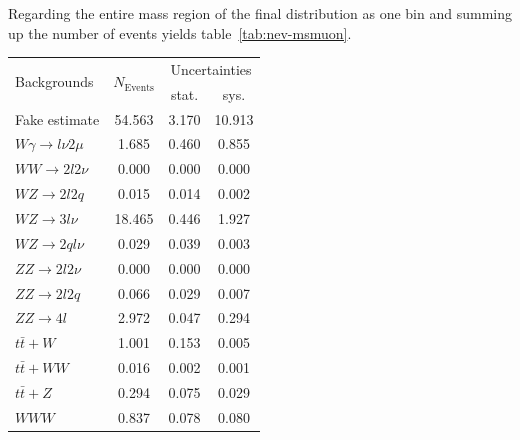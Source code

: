 Regarding the entire mass region of the final distribution as one bin and summing up the number of events yields table~\ref{tab:nev-msmuon}.

\begin{table}[!htb]
  \centering
  \begin{tabular}{|l|c|c|c|}
    \hline
    \multirow{2}{*}{Backgrounds}    & \multirow{2}{*}{$N_{\text{Events}}$} & \multicolumn{2}{|c|}{Uncertainties} \\ \cline{3-4}
                                    &                                      & stat. & sys.                        \\ \hline \hline
    Fake estimate                   & 54.563                               & 3.170 & 10.913                      \\ \hline
    $W\gamma \rightarrow l\nu 2\mu$ & 1.685                                & 0.460 & 0.855                       \\ 
    $WW \rightarrow 2l 2\nu$        & 0.000                                & 0.000 & 0.000                       \\ 
    $WZ \rightarrow 2l 2q$          & 0.015                                & 0.014 & 0.002                       \\ 
    $WZ \rightarrow 3l \nu$         & 18.465                               & 0.446 & 1.927                       \\ 
    $WZ \rightarrow 2q l \nu$       & 0.029                                & 0.039 & 0.003                       \\ 
    $ZZ \rightarrow 2l 2\nu$        & 0.000                                & 0.000 & 0.000                       \\ 
    $ZZ \rightarrow 2l 2q$          & 0.066                                & 0.029 & 0.007                       \\ 
    $ZZ \rightarrow 4l$             & 2.972                                & 0.047 & 0.294                       \\ \hline
    $t\bar{t} + W$                  & 1.001                                & 0.153 & 0.005                       \\ 
    $t\bar{t} + WW$                 & 0.016                                & 0.002 & 0.001                       \\ 
    $t\bar{t} + Z$                  & 0.294                                & 0.075 & 0.029                       \\ \hline
    $WWW$                           & 0.837                                & 0.078 & 0.080                       \\ 

\end{tabular}
\end{table}
